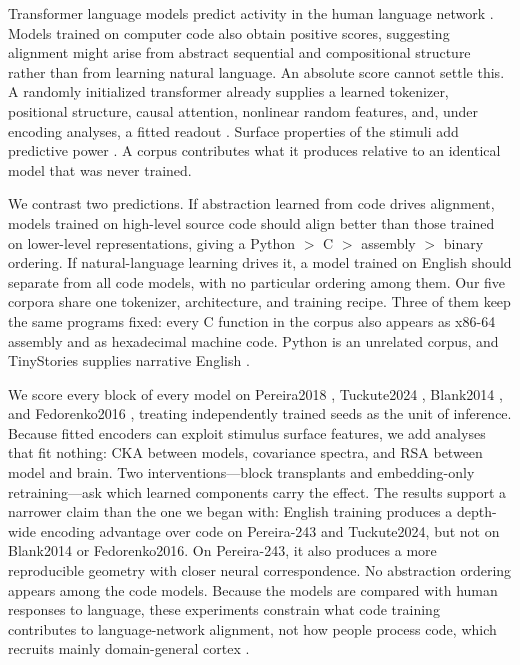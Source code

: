 \documentclass[mlmain]{jmlr}
\begin{document}
Transformer language models predict activity in the human language network \citep{schrimpf2021neural,caucheteux2022brains,goldstein2022shared}. Models trained on computer code also obtain positive scores, suggesting alignment might arise from abstract sequential and compositional structure rather than from learning natural language. An absolute score cannot settle this. A randomly initialized transformer already supplies a learned tokenizer, positional structure, causal attention, nonlinear random features, and, under encoding analyses, a fitted readout \citep{pasquiou2022notborn,alkhamissi2024shallow}. Surface properties of the stimuli add predictive power \citep{feghhi2024brainscores}. A corpus contributes what it produces relative to an identical model that was never trained.

We contrast two predictions. If abstraction learned from code drives alignment, models trained on high-level source code should align better than those trained on lower-level representations, giving a Python $>$ C $>$ assembly $>$ binary ordering. If natural-language learning drives it, a model trained on English should separate from all code models, with no particular ordering among them. Our five corpora share one tokenizer, architecture, and training recipe. Three of them keep the same programs fixed: every C function in the corpus also appears as x86-64 assembly and as hexadecimal machine code. Python is an unrelated corpus, and TinyStories supplies narrative English \citep{eldan2023tinystories}.

We score every block of every model on Pereira2018 \citep{pereira2018universal}, Tuckute2024 \citep{tuckute2024driving}, Blank2014 \citep{blank2014dissociation}, and Fedorenko2016 \citep{fedorenko2016ecog}, treating independently trained seeds as the unit of inference. Because fitted encoders can exploit stimulus surface features, we add analyses that fit nothing: CKA between models, covariance spectra, and RSA between model and brain. Two interventions—block transplants and embedding-only retraining—ask which learned components carry the effect. The results support a narrower claim than the one we began with: English training produces a depth-wide encoding advantage over code on Pereira-243 and Tuckute2024, but not on Blank2014 or Fedorenko2016. On Pereira-243, it also produces a more reproducible geometry with closer neural correspondence. No abstraction ordering appears among the code models. Because the models are compared with human responses to language, these experiments constrain what code training contributes to language-network alignment, not how people process code, which recruits mainly domain-general cortex \citep{ivanova2020codecomprehension,liu2020codelogic}.
\end{document}
